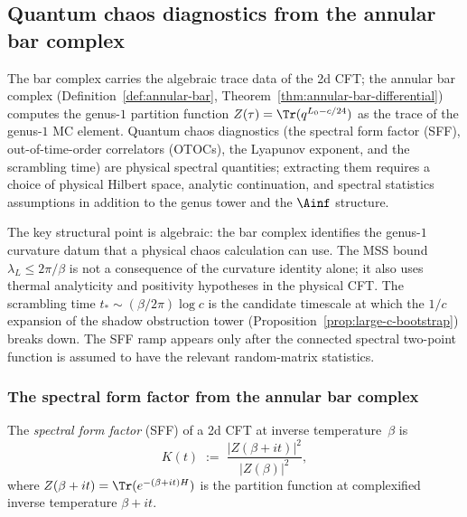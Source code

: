 \subsection{Quantum chaos diagnostics from the annular bar complex}
\label{subsec:quantum-chaos-bar}

The bar complex carries the algebraic trace data of the
2d CFT; the annular bar complex
(Definition~\ref{def:annular-bar},
Theorem~\ref{thm:annular-bar-differential})
computes the genus-$1$ partition function
$Z(\tau) = \Tr(q^{L_0 - c/24})$
as the trace of the genus-$1$ MC element. Quantum chaos
diagnostics (the spectral form factor (SFF), out-of-time-order
correlators (OTOCs), the Lyapunov exponent, and the scrambling
time) are physical spectral quantities; extracting them requires a
choice of physical Hilbert space, analytic continuation, and spectral
statistics assumptions in addition to the genus tower and the
\(\Ainf\) structure.

The key structural point is algebraic: the bar complex identifies the
genus-$1$ curvature datum that a physical chaos calculation can use.
The MSS bound \(\lambda_L \le 2\pi/\beta\) is not a consequence of the
curvature identity alone; it also uses thermal analyticity and
positivity hypotheses in the physical CFT.
The scrambling time $t_* \sim (\beta/2\pi)\log c$ is the
candidate timescale at which the \(1/c\) expansion of the shadow
obstruction tower (Proposition~\ref{prop:large-c-bootstrap}) breaks
down. The SFF ramp appears only after the connected spectral
two-point function is assumed to have the relevant random-matrix
statistics.

\subsubsection*{The spectral form factor from the annular bar complex}

\begin{definition}
\label{def:spectral-form-factor}%
%
The \emph{spectral form factor} (SFF) of a 2d CFT at inverse
temperature~$\beta$ is
\begin{equation}\label{eq:sff-definition}
K(t)
\;:=\;
\frac{|Z(\beta + it)|^2}{|Z(\beta)|^2},
\end{equation}
where $Z(\beta + it) = \Tr(e^{-(\beta+it)H})$ is the partition
function at complexified inverse temperature $\beta + it$.
\end{definition}

